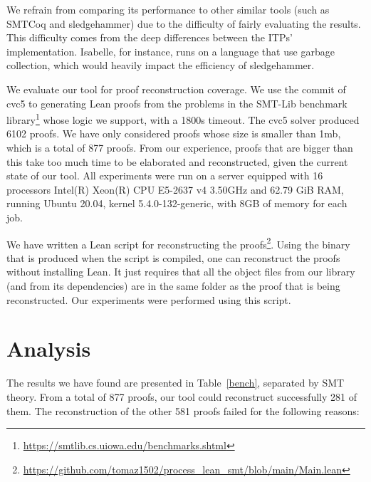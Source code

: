 We refrain from comparing its performance to other similar tools (such as
SMTCoq and sledgehammer) due to the difficulty of fairly evaluating
the results. This difficulty comes from the deep differences between the ITPs'
implementation. Isabelle, for instance, runs on a language that use
garbage collection, which would heavily impact the efficiency of
sledgehammer.

We evaluate our tool for proof reconstruction coverage.
We use the commit
 of cvc5 to generating Lean proofs from the
problems in the SMT-Lib benchmark library\footnote{\url{https://smtlib.cs.uiowa.edu/benchmarks.shtml}} whose
logic we support, with a 1800s timeout. The cvc5 solver produced 6102
proofs. We have only considered proofs whose size is smaller than
1mb, which is a total of 877 proofs. From our experience, proofs that are
bigger than this take too much time to be elaborated and reconstructed,
given the current state of our tool.
All experiments were run on a server
equipped with 16 processors Intel(R) Xeon(R) CPU E5-2637 v4 3.50GHz and
62.79 GiB RAM, running Ubuntu 20.04, kernel 5.4.0-132-generic, with 8GB of memory for each job.

We have written a Lean script for reconstructing the proofs\footnote{\url{https://github.com/tomaz1502/process_lean_smt/blob/main/Main.lean}}. Using the binary that is produced when the script is compiled, one can reconstruct the proofs without installing Lean.
It just requires that all the object files from our library (and from its dependencies) are in the same folder as the proof that is being reconstructed.
Our experiments were performed using this script.

\section{Analysis}

The results we have found are presented in Table~\ref{bench}, separated
by SMT theory. From a total of 877 proofs, our tool could reconstruct
successfully 281 of them. The reconstruction of the other 581 proofs
failed for the following reasons:


